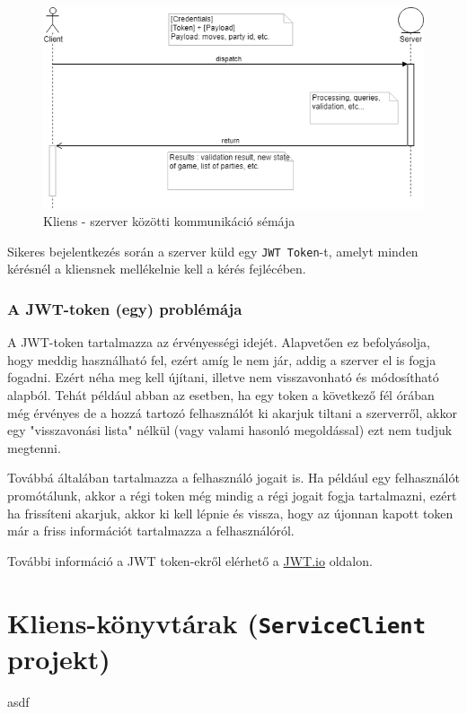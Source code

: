 \documentclass[twoside, a4paper, 12pt]{book}
\begin{document}
\begin{figure}[htbp]
	\centering
	\includegraphics[width=1.0\textwidth]{img/clientServerCommunication.png}
	\caption{Kliens - szerver közötti kommunikáció sémája}
	\label{fig:clientServerCommunication}
\end{figure}

Sikeres bejelentkezés során a szerver küld egy \texttt{JWT Token}-t, amelyt minden kérésnél a kliensnek mellékelnie kell a kérés fejlécében.

\subsubsection{A JWT-token (egy) problémája}
A JWT-token tartalmazza az érvényességi idejét. Alapvetően ez befolyásolja, hogy meddig használható fel, ezért amíg le nem jár, addig a szerver el is fogja fogadni. Ezért néha meg kell újítani, illetve nem visszavonható és módosítható alapból. Tehát például abban az esetben, ha egy token a következő fél órában még érvényes de a hozzá tartozó felhasználót ki akarjuk tiltani a szerverről, akkor egy "visszavonási lista" nélkül (vagy valami hasonló megoldással) ezt nem tudjuk megtenni.

Továbbá általában tartalmazza a felhasználó jogait is. Ha például egy felhasználót promótálunk, akkor a régi token még mindig a régi jogait fogja tartalmazni, ezért ha frissíteni akarjuk, akkor ki kell lépnie és vissza, hogy az újonnan kapott token már a friss információt tartalmazza a felhasználóról.

További információ a JWT token-ekről elérhető a \href{https://jwt.io/}{JWT.io} oldalon.

\section{Kliens-könyvtárak (\texttt{ServiceClient} projekt)}
asdf
\end{document}

